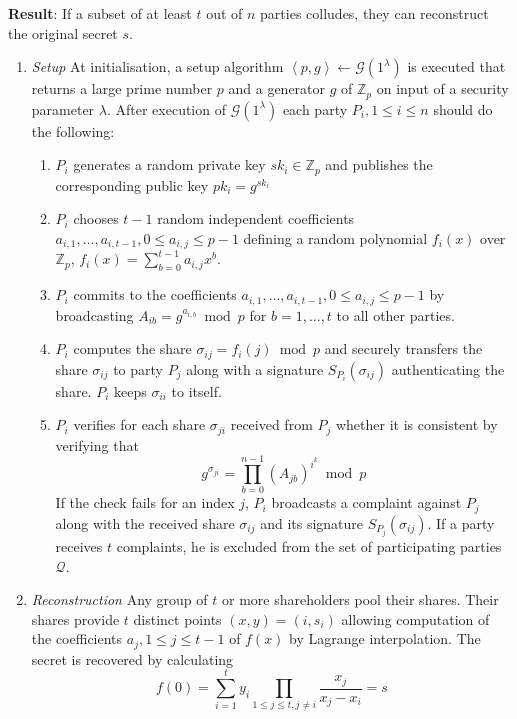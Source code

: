 \begin{algorithm}
\begin{description}
 \item \textbf{Result}: If a subset of at least $t$ out of $n$ parties colludes, they can reconstruct the original secret $s$.
\end{description}
 \begin{enumerate}
  \item \textit{Setup} At initialisation, a setup algorithm $\left< p, g \right> \leftarrow \mathcal{G} \left( 1^{\lambda} \right)$ is executed that returns a large prime number $p$ and a generator $g$ of $\mathbb{Z}_p$ on input of a security parameter $\lambda$. After execution of $\mathcal{G} \left( 1^{\lambda} \right)$ each party $P_i, 1 \leq i \leq n$ should do the following:
   \begin{enumerate}
    \item $P_i$ generates a random private key $sk_i \in \mathbb{Z}_p$ and publishes the corresponding public key $pk_i = g^{sk_i}$
    \item $P_i$ chooses $t-1$ random independent coefficients $a_{i,1}, \ldots, a_{i,t-1}, 0 \leq a_{i,j} \leq p-1$ defining a random polynomial $f_i \left( x \right)$ over $\mathbb{Z}_p$, $f_i \left( x \right) = \sum^{t-1}_{b=0} a_{i,j} x^b$.
    \item $P_i$ commits to the coefficients $a_{i,1}, \ldots, a_{i,t-1}, 0 \leq a_{i,j} \leq p-1$ by broadcasting $A_{ib} = g^{a_{i,b}} \bmod p$ for $b = 1, \ldots, t$ to all other parties.
    \item $P_i$ computes the share $\sigma_{ij} = f_i \left( j \right) \bmod p$ and securely transfers the share $\sigma_{ij}$ to party $P_j$ along with a signature $S_{P_i} \left( \sigma_{ij} \right)$ authenticating the share. $P_i$ keeps $\sigma_{ii}$ to itself.
    \item $P_i$ verifies for each share $\sigma_{ji}$ received from $P_j$ whether it is consistent by verifying that
    \begin{equation*}
     g^{\sigma_{ji}} = \prod_{b=0}^{n-1} \left( A_{jb} \right)^{i^k} \bmod p
    \end{equation*}
    If the check fails for an index $j$, $P_i$ broadcasts a complaint against $P_j$ along with the received share $\sigma_{ij}$ and its signature $S_{P_j} \left( \sigma_{ij} \right)$. If a party receives $t$ complaints, he is excluded from the set of participating parties $\mathcal{Q}$.
   \end{enumerate}
   \item \textit{Reconstruction} Any group of $t$ or more shareholders pool their shares. Their shares provide $t$ distinct points $\left( x, y \right) = \left( i, s_i \right)$ allowing computation of the coefficients $a_j, 1 \leq j \leq t-1$ of $f \left( x \right)$ by Lagrange interpolation. The secret is recovered by calculating
 \begin{equation*}
  f \left( 0 \right) = \sum^t_{i=1}y_i \prod_{1 \leq j \leq t, j \neq i} \frac{x_j}{x_j-x_i} = s
 \end{equation*}
 \end{enumerate}
\end{algorithm}

